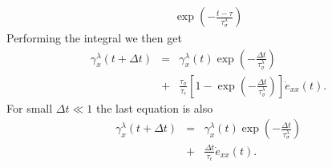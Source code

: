\documentclass[11pt]{article}
\begin{document}
{\begin{eqnarray*}
       \exp(-\frac{t-\tau}{\tau^{\lambda}_{\sigma}})
\end{eqnarray*}
Performing the integral we then get
\begin{eqnarray*}
\gamma^{\lambda}_x(t+\Delta t) 
   & = & \gamma^{\lambda}_x (t)\exp(-\frac{\Delta t}{\tau^{\lambda}_{\sigma}}) \\
   & + & \frac{\tau_{\sigma}}{\tau_{\epsilon}}
         \left[1-\exp(-\frac{\Delta t}{\tau^{\lambda}_{\sigma}})\right]
         \dot{e}_{xx}(t).
\end{eqnarray*}
%
For small $\Delta t \ll 1$ the last equation is also
\begin{eqnarray*}
\gamma^{\lambda}_x(t+\Delta t) 
   & = & \gamma^{\lambda}_x (t)\exp(-\frac{\Delta t}{\tau^{\lambda}_{\sigma}}) \\
   & + & \frac{\Delta t}{\tau_{\epsilon}}\dot{e}_{xx}(t).
\end{eqnarray*}
}
\end{document}
